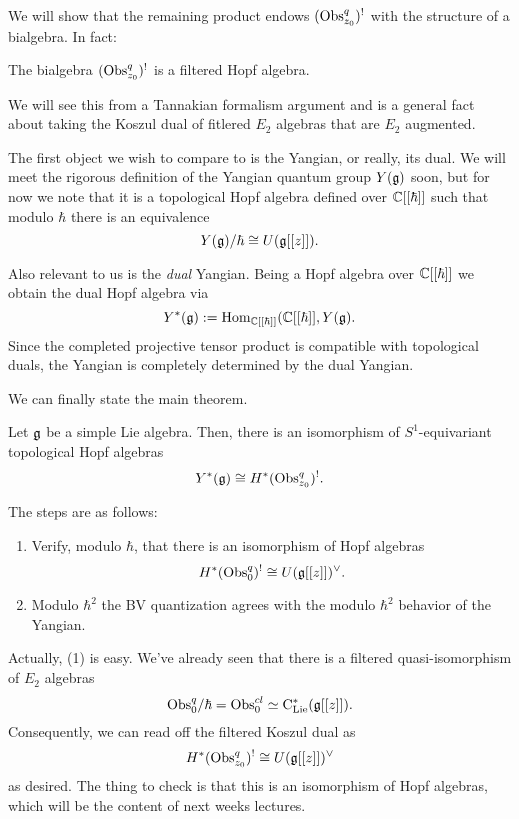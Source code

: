 \documentclass[11pt]{amsart}
\begin{document}
We will show that the remaining product endows $({\rm Obs}^q_{z_0})^{!}$ with the structure of a bialgebra. 
In fact:

\begin{prop}
The bialgebra $({\rm Obs}^q_{z_0})^{!}$ is a filtered Hopf algebra. 
\end{prop}

We will see this from a Tannakian formalism argument and is a general fact about taking the Koszul dual of fitlered $E_2$ algebras that are $E_2$ augmented. 

The first object we wish to compare to is the Yangian, or really, its dual. 
We will meet the rigorous definition of the Yangian quantum group $Y(\mathfrak g)$ soon, but for now we note that it is a topological Hopf algebra defined over $\mathbb C[[\hbar]]$ such that modulo $\hbar$ there is an equivalence
\[
Y(\mathfrak g) / \hbar \cong U(\mathfrak g[[z]]) .
\] 

Also relevant to us is the {\em dual} Yangian. 
Being a Hopf algebra over $\mathbb C[[\hbar]]$ we obtain the dual Hopf algebra via
\[
Y^*(\mathfrak g) := {\rm Hom}_{\mathbb C[[\hbar]]} (\mathbb C[[\hbar]], Y(\mathfrak g) .
\] 
Since the completed projective tensor product is compatible with topological duals, the Yangian is completely determined by the dual Yangian. 

We can finally state the main theorem. 

\begin{thm}
Let $\mathfrak g$ be a simple Lie algebra. 
Then, there is an isomorphism of $S^1$-equivariant topological Hopf algebras
\[
Y^*(\mathfrak g) \cong H^*({\rm Obs}^q_{z_0})^{!} .
\] 
\end{thm}

The steps are as follows:
\begin{enumerate}
\item Verify, modulo $\hbar$, that there is an isomorphism of Hopf algebras
\[
H^*({\rm Obs}^q_{0})^{!} \cong U(\mathfrak g[[z]])^\vee .
\] 

\item Modulo $\hbar^2$ the BV quantization agrees with the modulo $\hbar^2$ behavior of the Yangian. 

\end{enumerate}

Actually, (1) is easy. 
We've already seen that there is a filtered quasi-isomorphism of $E_2$ algebras
\[
{\rm Obs}_{0}^{q} / \hbar = {\rm Obs}^{cl}_{0} \simeq {\rm C}_{{\rm Lie}}^*(\mathfrak g[[z]]) .
\] 
Consequently, we can read off the filtered Koszul dual as
\[
H^*({\rm Obs}^q_{z_0})^{!} \cong U(\mathfrak g[[z]])^\vee
\]
as desired. 
The thing to check is that this is an isomorphism of Hopf algebras, which will be the content of next weeks lectures. 
\end{document}
